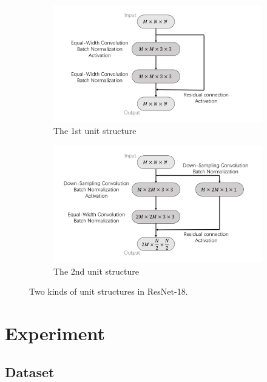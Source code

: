 \documentclass{article}
\begin{document}
\begin{figure}[p]
	\centering
	\begin{subfigure}{0.7\textwidth}
		\centering
		\includegraphics[width=\linewidth]
		{../Graph/ResNetI.png}
		\caption{The 1st unit structure}
	\end{subfigure}
	\begin{subfigure}{0.7\textwidth}
		\centering
		\includegraphics[width=\linewidth]
		{../Graph/ResNetII.png}
		\caption{The 2nd unit structure}
	\end{subfigure}
	\caption{Two kinds of unit structures in ResNet-18.}
	\label{fig:resnet}
\end{figure}

\section{Experiment}

\subsection{Dataset}
\end{document}

